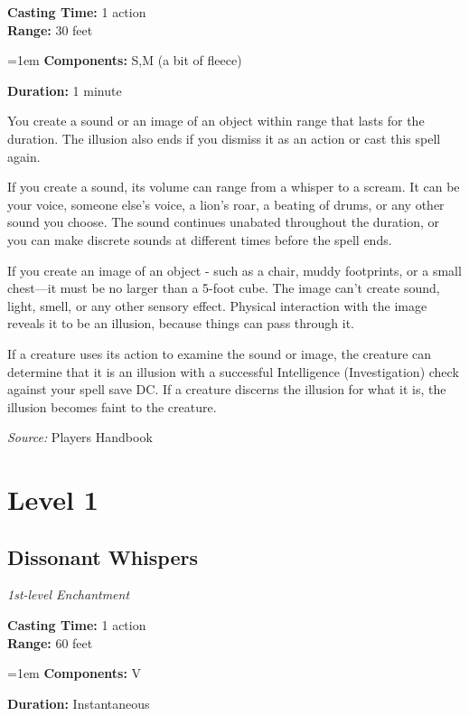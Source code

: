 \documentclass[10pt,twoside,twocolumn]{article}
\begin{document}
\noindent
\textbf{Casting Time:}  1 action\\
\textbf{Range:}  30 feet

\noindent
\hangindent=1em
\textbf{Components:}  S,M (a bit of fleece)

\noindent
\textbf{Duration:}  1 minute\\
\smallskip



You create a sound or an image of an object within range that lasts for the duration. The illusion also ends if you dismiss it as an action or cast this spell again.

If you create a sound, its volume can range from a whisper to a scream. It can be your voice, someone else's voice, a lion's roar, a beating of drums, or any other sound you choose. The sound continues unabated throughout the duration, or you can make discrete sounds at different times before the spell ends.

If you create an image of an object - such as a chair, muddy footprints, or a small chest—it must be no larger than a 5-foot cube. The image can't create sound, light, smell, or any other sensory effect. Physical interaction with the image reveals it to be an illusion, because things can pass through it.

If a creature uses its action to examine the sound or image, the creature can determine that it is an illusion with a successful Intelligence (Investigation) check against your spell save DC. If a creature discerns the illusion for what it is, the illusion becomes faint to the creature.



\textit{Source:} Players Handbook

\vfill
\section{Level 1}
\subsection{Dissonant Whispers}
\textit{1st-level Enchantment}
\smallskip

\noindent
\textbf{Casting Time:}  1 action\\
\textbf{Range:}  60 feet

\noindent
\hangindent=1em
\textbf{Components:}  V

\noindent
\textbf{Duration:}  Instantaneous\\
\smallskip
\end{document}
